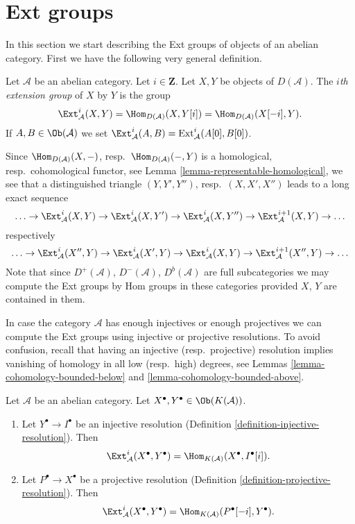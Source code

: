 \section{Ext groups}
\label{section-ext}

\noindent
In this section we start describing the Ext groups of objects
of an abelian category. First we have the following very general
definition.

\begin{definition}
\label{definition-ext}
Let $\mathcal{A}$ be an abelian category. Let $i \in \mathbf{Z}$. Let
$X, Y$ be objects of $D(\mathcal{A})$. The {\it $i$th extension group}
of $X$ by $Y$ is the group
$$
\Ext^i_\mathcal{A}(X, Y) =
\Hom_{D(\mathcal{A})}(X, Y[i]) =
\Hom_{D(\mathcal{A})}(X[-i], Y).
$$
If $A, B \in \Ob(\mathcal{A})$ we set
$\Ext^i_\mathcal{A}(A, B) = \text{Ext}^i_\mathcal{A}(A[0], B[0])$.
\end{definition}

\noindent
Since $\Hom_{D(\mathcal{A})}(X, -)$,
resp.\ $\Hom_{D(\mathcal{A})}(-, Y)$ is a homological,
resp.\ cohomological functor, see
Lemma \ref{lemma-representable-homological},
we see that a distinguished triangle $(Y, Y', Y'')$,
resp.\ $(X, X', X'')$ leads to a long exact sequence
$$
\ldots \to
\Ext^i_\mathcal{A}(X, Y) \to
\Ext^i_\mathcal{A}(X, Y') \to
\Ext^i_\mathcal{A}(X, Y'') \to
\Ext^{i + 1}_\mathcal{A}(X, Y) \to \ldots
$$
respectively
$$
\ldots \to
\Ext^i_\mathcal{A}(X'', Y) \to
\Ext^i_\mathcal{A}(X', Y) \to
\Ext^i_\mathcal{A}(X, Y) \to
\Ext^{i + 1}_\mathcal{A}(X'', Y) \to \ldots
$$
Note that since $D^+(\mathcal{A})$, $D^-(\mathcal{A})$, $D^b(\mathcal{A})$
are full subcategories we may compute the Ext groups by Hom groups
in these categories provided $X$, $Y$ are contained in them.

\medskip\noindent
In case the category $\mathcal{A}$ has enough injectives or enough
projectives we can compute the Ext groups using injective or
projective resolutions. To avoid confusion, recall that having an
injective (resp.\ projective) resolution implies vanishing of homology
in all low (resp.\ high) degrees, see
Lemmas \ref{lemma-cohomology-bounded-below} and
\ref{lemma-cohomology-bounded-above}.

\begin{lemma}
\label{lemma-compute-ext-resolutions}
Let $\mathcal{A}$ be an abelian category.
Let $X^\bullet, Y^\bullet \in \Ob(K(\mathcal{A}))$.
\begin{enumerate}
\item Let $Y^\bullet \to I^\bullet$ be an injective resolution
(Definition \ref{definition-injective-resolution}). Then
$$
\Ext^i_\mathcal{A}(X^\bullet, Y^\bullet) =
\Hom_{K(\mathcal{A})}(X^\bullet, I^\bullet[i]).
$$
\item Let $P^\bullet \to X^\bullet$ be a projective resolution
(Definition \ref{definition-projective-resolution}). Then
$$
\Ext^i_\mathcal{A}(X^\bullet, Y^\bullet) =
\Hom_{K(\mathcal{A})}(P^\bullet[-i], Y^\bullet).
$$
\end{enumerate}
\end{lemma}

